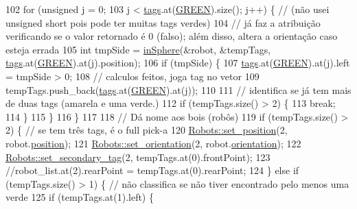 \begin{DoxyCode}
102         \textcolor{keywordflow}{for} (\textcolor{keywordtype}{unsigned} j = 0;
103              j < \hyperlink{class_vision_acc5bbdf18ba36cc516c17999308be267}{tags}.at(\hyperlink{class_vision_aa6daf48b10c075b01c40c4de1240e17f}{GREEN}).size(); j++) \{ \textcolor{comment}{// (não usei unsigned short pois pode ter muitas
       tags verdes)}
104             \textcolor{comment}{// já faz a atribuição verificando se o valor retornado é 0 (falso); além disso, altera a
       orientação caso esteja errada}
105             \textcolor{keywordtype}{int} tmpSide = \hyperlink{class_vision_a52fc530a0beea6bc8821cb83c5ae2cc5}{inSphere}(&robot, &tempTags, \hyperlink{class_vision_acc5bbdf18ba36cc516c17999308be267}{tags}.at(\hyperlink{class_vision_aa6daf48b10c075b01c40c4de1240e17f}{GREEN}).at(j).position);
106             \textcolor{keywordflow}{if} (tmpSide) \{
107                 \hyperlink{class_vision_acc5bbdf18ba36cc516c17999308be267}{tags}.at(\hyperlink{class_vision_aa6daf48b10c075b01c40c4de1240e17f}{GREEN}).at(j).left = tmpSide > 0;
108                 \textcolor{comment}{// calculos feitos, joga tag no vetor}
109                 tempTags.push\_back(\hyperlink{class_vision_acc5bbdf18ba36cc516c17999308be267}{tags}.at(\hyperlink{class_vision_aa6daf48b10c075b01c40c4de1240e17f}{GREEN}).at(j));
110 
111                 \textcolor{comment}{// identifica se já tem mais de duas tags (amarela e uma verde.)}
112                 \textcolor{keywordflow}{if} (tempTags.size() > 2) \{
113                     \textcolor{keywordflow}{break};
114                 \}
115             \}
116         \}
117 
118         \textcolor{comment}{// Dá nome aos bois (robôs)}
119         \textcolor{keywordflow}{if} (tempTags.size() > 2) \{ \textcolor{comment}{// se tem três tags, é o full pick-a}
120             \hyperlink{class_robots_a96ac427f418c25db0c74295f75a58cbb}{Robots::set\_position}(2, robot.\hyperlink{struct_robots_1_1___status_a9ae95d6ec38055984ee4eaac82138373}{position});
121             \hyperlink{class_robots_a9040aa6c409fe67186aaa52f9183b7c1}{Robots::set\_orientation}(2, robot.\hyperlink{struct_robots_1_1___status_ae7a5a28b09e25cf94607fc00b57f7c7e}{orientation});
122             \hyperlink{class_robots_a40620e7ef7a3003736ab1c0b82c2b3b2}{Robots::set\_secondary\_tag}(2, tempTags.at(0).frontPoint);
123             \textcolor{comment}{//robot\_list.at(2).rearPoint = tempTags.at(0).rearPoint;}
124         \} \textcolor{keywordflow}{else} \textcolor{keywordflow}{if} (tempTags.size() > 1) \{ \textcolor{comment}{// não classifica se não tiver encontrado pelo menos uma verde}
125             \textcolor{keywordflow}{if} (tempTags.at(1).left) \{

\end{DoxyCode}
